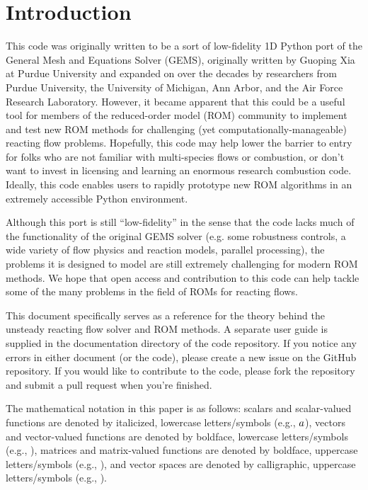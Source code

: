 \newpage
\section{Introduction}

This code was originally written to be a sort of low-fidelity 1D Python port of the General Mesh and Equations Solver (GEMS), originally written by Guoping Xia at Purdue University and expanded on over the decades by researchers from Purdue University, the University of Michigan, Ann Arbor, and the Air Force Research Laboratory. However, it became apparent that this could be a useful tool for members of the reduced-order model (ROM) community to implement and test new ROM methods for challenging (yet computationally-manageable) reacting flow problems. Hopefully, this code may help lower the barrier to entry for folks who are not familiar with multi-species flows or combustion, or don't want to invest in licensing and learning an enormous research combustion code. Ideally, this code enables users to rapidly prototype new ROM algorithms in an extremely accessible Python environment.

Although this port is still ``low-fidelity'' in the sense that the code lacks much of the functionality of the original GEMS solver (e.g. some robustness controls, a wide variety of flow physics and reaction models, parallel processing), the problems it is designed to model are still extremely challenging for modern ROM methods. We hope that open access and contribution to this code can help tackle some of the many problems in the field of ROMs for reacting flows.

This document specifically serves as a reference for the theory behind the unsteady reacting flow solver and ROM methods. A separate user guide is supplied in the documentation directory of the code repository. If you notice any errors in either document (or the code), please create a new issue on the GitHub repository. If you would like to contribute to the code, please fork the repository and submit a pull request when you're finished.

The mathematical notation in this paper is as follows: scalars and scalar-valued functions are denoted by italicized, lowercase letters/symbols (e.g., $a$), vectors and vector-valued functions are denoted by boldface, lowercase letters/symbols (e.g., \dummyVec), matrices and matrix-valued functions are denoted by boldface, uppercase letters/symbols (e.g., \dummyMat), and vector spaces are denoted by calligraphic, uppercase letters/symbols (e.g., \dummySpace).


